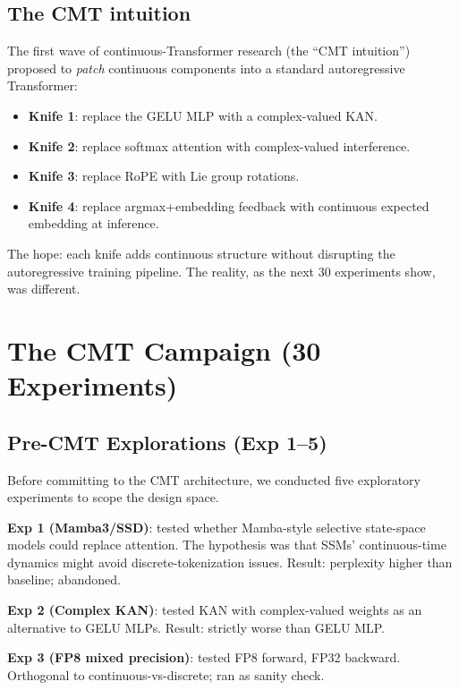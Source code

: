 \documentclass{article}
\begin{document}
\subsection{The CMT intuition}

The first wave of continuous-Transformer research (the ``CMT intuition'') proposed to \emph{patch} continuous components into a standard autoregressive Transformer:

\begin{itemize}
    \item \textbf{Knife 1}: replace the GELU MLP with a complex-valued KAN.
    \item \textbf{Knife 2}: replace softmax attention with complex-valued interference.
    \item \textbf{Knife 3}: replace RoPE with Lie group rotations.
    \item \textbf{Knife 4}: replace argmax+embedding feedback with continuous expected embedding at inference.
\end{itemize}

The hope: each knife adds continuous structure without disrupting the autoregressive training pipeline. The reality, as the next 30 experiments show, was different.

\section{The CMT Campaign (30 Experiments)}

\subsection{Pre-CMT Explorations (Exp 1--5)}

Before committing to the CMT architecture, we conducted five exploratory experiments to scope the design space.

\textbf{Exp 1 (Mamba3/SSD)}: tested whether Mamba-style selective state-space models could replace attention. The hypothesis was that SSMs' continuous-time dynamics might avoid discrete-tokenization issues. Result: perplexity higher than baseline; abandoned.

\textbf{Exp 2 (Complex KAN)}: tested KAN with complex-valued weights as an alternative to GELU MLPs. Result: strictly worse than GELU MLP.

\textbf{Exp 3 (FP8 mixed precision)}: tested FP8 forward, FP32 backward. Orthogonal to continuous-vs-discrete; ran as sanity check.
\end{document}
